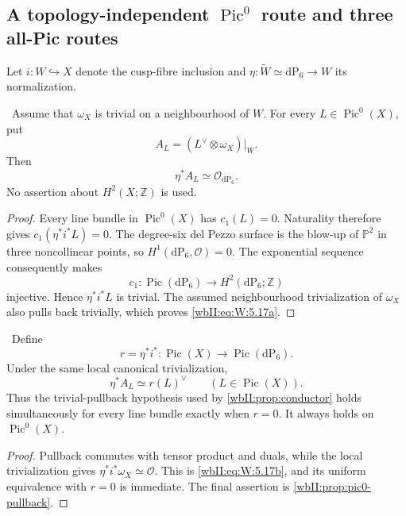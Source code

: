 \subsection{A topology-independent \texorpdfstring{$\operatorname{Pic}^0$}{Pic0} route and three all-Pic routes}

Let $i:W\hookrightarrow X$ denote the cusp-fibre inclusion and
$\eta:\widetilde W\simeq\mathrm{dP}_6\to W$ its normalization.

\begin{proposition}
\label{wbII:prop:pic0-pullback}
\ Assume that $\omega_X$ is trivial on a neighbourhood of $W$.
For every $L\in\operatorname{Pic}^0(X)$, put
\[
 A_L=(L^\vee\otimes\omega_X)|_W.
\]
Then
\[
 \eta^*A_L\simeq\mathcal O_{\mathrm{dP}_6}.
\tag{W.18}\label{wbII:eq:W:5.17a}
\]
No assertion about $H^2(X;\mathbb Z)$ is used.
\end{proposition}

\begin{proof}
Every line bundle in $\operatorname{Pic}^0(X)$ has $c_1(L)=0$.  Naturality
therefore gives $c_1(\eta^*i^*L)=0$.  The degree-six del Pezzo surface is the
blow-up of $\mathbb P^2$ in three noncollinear points, so
$H^1(\mathrm{dP}_6,\mathcal O)=0$.  The exponential sequence consequently
makes
\[
 c_1:\operatorname{Pic}(\mathrm{dP}_6)\longrightarrow
 H^2(\mathrm{dP}_6;\mathbb Z)
\]
injective.  Hence $\eta^*i^*L$ is trivial.  The assumed neighbourhood
trivialization of $\omega_X$ also pulls back trivially, which proves
\eqref{wbII:eq:W:5.17a}.
\end{proof}

\begin{proposition}
\label{wbII:prop:all-pic-restriction}
\ Define
\[
 r=\eta^*i^*:\operatorname{Pic}(X)\longrightarrow
 \operatorname{Pic}(\mathrm{dP}_6).
\]
Under the same local canonical trivialization,
\[
 \eta^*A_L\simeq r(L)^\vee
 \qquad(L\in\operatorname{Pic}(X)).
\tag{W.19}\label{wbII:eq:W:5.17b}
\]
Thus the trivial-pullback hypothesis used by
\cref{wbII:prop:conductor} holds simultaneously for every line bundle exactly
when $r=0$.  It always holds on $\operatorname{Pic}^0(X)$.
\end{proposition}

\begin{proof}
Pullback commutes with tensor product and duals, while the local
trivialization gives $\eta^*i^*\omega_X\simeq\mathcal O$.  This is \eqref{wbII:eq:W:5.17b},
and its uniform equivalence with $r=0$ is immediate.  The final assertion is
\cref{wbII:prop:pic0-pullback}.
\end{proof}

